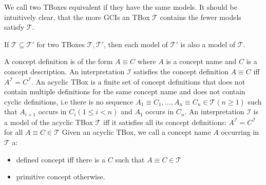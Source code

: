 We call two TBoxes equivalent if they have the same models.
It should be intuitively clear, that the more GCIs an TBox $\mathcal{T}$ contains the fewer models satisfy $\mathcal{T}$.

\begin{lemma}
	If $\mathcal{T} \subseteq \mathcal{T}'$ for two TBoxes $\mathcal{T}, \mathcal{T}'$, then each model of $\mathcal{T}'$ is also a model of $\mathcal{T}$.
\end{lemma}

\begin{definition}
	A concept definition is of the form $A \equiv C$ where $A$ is a concept name and  $C$ is a concept description.
	An interpretation $\mathcal{I}$ satisfies the concept definition $A \equiv C$ iff $A^{\mathcal{I}} = C^{\mathcal{I}}$.
	\newline
	An acyclic TBox is a finite set of concept definitions that does not contain multiple definitions for the same concept name and
	does not contain cyclic definitions, i.e there is no sequence $A_1 \equiv C_1, \ldots, A_n \equiv C_n \in \mathcal{T} (n \geq 1)$ such that
	$A_{i+1}$ occurs in $C_i (1 \leq i < n)$ and $A_1$ occurs in $C_{n}$. 
	\newline
	An interpretation $\mathcal{I}$ is a model of the acyclic TBox $\mathcal{T}$ iff it satisfies all its concept definitions: $A^{\mathcal{I}} = C^{\mathcal{I}}$ for all $A \equiv C \in \mathcal{T}$
	Given an acyclic TBox, we call a concept name $A$ occurring in $\mathcal{T}$ a:
	\begin{itemize}
		\item defined concept iff there is a $C$ such that $A \equiv C \in \mathcal{T}$ 
		\item primitive concept otherwise.
	\end{itemize}
\end{definition}
